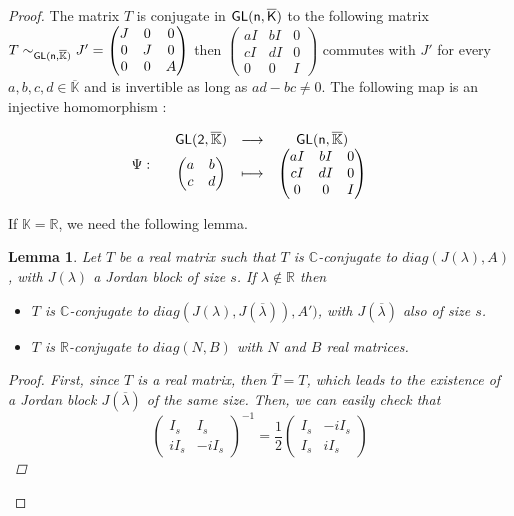 \documentclass[10pt,a4paper]{amsart}
\newtheorem{lemma}{Lemma}
\def \GL{\sf{GL}}
\newcommand{\K}{\mathbb K}
\newcommand{\R}{\mathbb R}
\begin{document}
\begin{proof}
The matrix $T$ is conjugate in $\GL(n,\overline{K})$ to the following matrix
    $T \sim_{\GL(n,\overline{\K})}
J'=\begin{pmatrix}
J & 0& 0 \\
0 & J & 0\\
0 & 0 & A 
\end{pmatrix} $
then 
$\begin{pmatrix}
aI & bI & 0 \\
cI & dI & 0\\
0 & 0 & I 
\end{pmatrix} $
commutes with $J'$ for every $a,b,c,d \in \overline{\K} $ and is invertible as long as $ad-bc\ne 0$.
The following map is an injective homomorphism : 

   \[ \Psi  :
\begin{array}{ccccc}
&  \GL(2,\overline{\K})  & \longrightarrow & \GL(n,\overline{\K}) & \\
& \begin{pmatrix}
a & b  \\
c & d 
\end{pmatrix}  & \longmapsto &
\begin{pmatrix}
aI & bI & 0 \\
cI & dI & 0 \\
0 & 0 & I
\end{pmatrix} \\
\end{array}
 \]



If $\K=\R$, we need the following lemma. 

\begin{lemma}\label{lemma5}
    Let $T$ be a real matrix such that $T$ is $\mathbb{C}$-conjugate to $diag(J(\lambda),A )$, with $J(\lambda)$ a Jordan block of size $s$. \newline
    If $\lambda \notin \R$ then
    \begin{itemize}
        \item $T$ is $\mathbb{C}$-conjugate to $diag(J(\lambda), J(\overline{\lambda})), A')$, with $J(\overline{\lambda})$ also of  size $s$.
        \item $T$ is $\R$-conjugate to $diag(N,B)$ with $N$ and $B$ real matrices.
    \end{itemize}
\begin{proof}
    First, since $T$ is a real matrix, then $\overline{T}=T$, which leads to the existence of a Jordan block $J(\overline{\lambda})$ of the same size.
    Then, we can easily check that 
$$\begin{pmatrix}
I_s & I_s \\
iI_s & -iI_s  
\end{pmatrix}^{-1}= \frac{1}{2}\begin{pmatrix}
I_s & -iI_s \\
I_s & iI_s  
\end{pmatrix}$$ 


\end{proof}
\end{lemma}
\end{proof}
\end{document}
